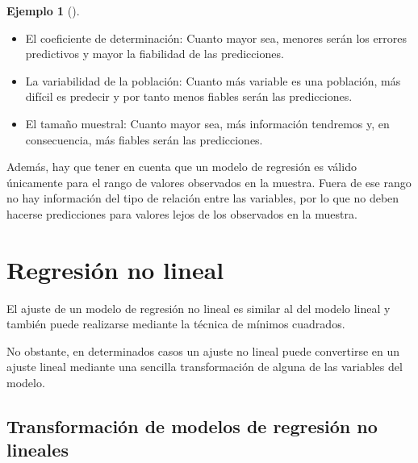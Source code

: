 \documentclass[
  spanish,
  a4paper,
]{scrreport}
\providecommand{\tightlist}{%
  \setlength{\itemsep}{0pt}\setlength{\parskip}{0pt}}
\theoremstyle{plain}
\theoremstyle{definition}
\newtheorem{example}{Ejemplo}[chapter]
\theoremstyle{definition}
\theoremstyle{remark}
\begin{document}
\begin{example}[]
\begin{itemize}
\tightlist
\item
  El coeficiente de determinación: Cuanto mayor sea, menores serán los
  errores predictivos y mayor la fiabilidad de las predicciones.
\item
  La variabilidad de la población: Cuanto más variable es una población,
  más difícil es predecir y por tanto menos fiables serán las
  predicciones.
\item
  El tamaño muestral: Cuanto mayor sea, más información tendremos y, en
  consecuencia, más fiables serán las predicciones.
\end{itemize}

\begin{tcolorbox}[enhanced jigsaw, arc=.35mm, bottomrule=.15mm, bottomtitle=1mm, breakable, colback=white, colbacktitle=quarto-callout-warning-color!10!white, colframe=quarto-callout-warning-color-frame, coltitle=black, left=2mm, leftrule=.75mm, opacityback=0, opacitybacktitle=0.6, rightrule=.15mm, title=\textcolor{quarto-callout-warning-color}{\faExclamationTriangle}\hspace{0.5em}{Advertencia}, titlerule=0mm, toprule=.15mm, toptitle=1mm]

Además, hay que tener en cuenta que un modelo de regresión es válido
únicamente para el rango de valores observados en la muestra. Fuera de
ese rango no hay información del tipo de relación entre las variables,
por lo que no deben hacerse predicciones para valores lejos de los
observados en la muestra.

\end{tcolorbox}

\end{example}

\section{Regresión no lineal}\label{regresiuxf3n-no-lineal}

El ajuste de un modelo de regresión no lineal es similar al del modelo
lineal y también puede realizarse mediante la técnica de mínimos
cuadrados.

No obstante, en determinados casos un ajuste no lineal puede convertirse
en un ajuste lineal mediante una sencilla transformación de alguna de
las variables del modelo.

\subsection{Transformación de modelos de regresión no
lineales}\label{transformaciuxf3n-de-modelos-de-regresiuxf3n-no-lineales}
\end{document}
